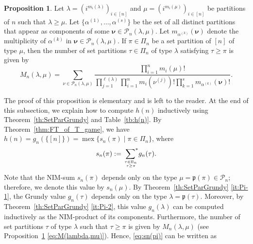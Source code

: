 \documentclass[a4paper,11pt]{amsart}
\theoremstyle{definition}
\newtheorem{prop}{Proposition}[section]
\newcommand{\mex}{\operatorname{mex}}
\newcommand{\nimadd}{\overset{*}{+}}
\newcommand{\nimsum}{{\sum}^{*}}
\numberwithin{equation}{section}
\def\Par{\mathscr{P}}
\def\fnb{\mathfrak{p}}
\def\bnu{\boldsymbol{\nu}}
\begin{document}
%
\par
%
%
%
\begin{prop}\label{lem:M(lambda,mu)}
%
Let $\lambda=(i^{m_{i}(\lambda)})_{i\in[n]}$
and $\mu=(i^{m_{i}(\mu)})_{i\in[n]}$
be partitions of $n$ such that $\lambda\geq\mu$.
%
Let $\{\alpha^{(1)},\dots,\alpha^{(s)}\}$ be the set of all distinct partitions that appear as components of some $\bnu\in\Par_{n}(\lambda,\mu)$.
Let $m_{\alpha^{(k)}}(\bnu)$ denote the multiplicity of $\alpha^{(k)}$ in $\bnu\in\Par_{n}(\lambda,\mu)$.
If $\pi\in\Pi_{n}$ be a set partition of $[n]$ of type $\mu$,
%
then the number of set partitions $\tau\in\Pi_{n}$ of type $\lambda$ satisfying $\tau\geq\pi$
 is given by
%
\begin{equation}\label{eq:M(lambda,mu)}
M_{n}(\lambda,\mu)=\sum_{\nu\in\Par_{n}(\lambda,\mu)}
\frac{\prod_{i=1}^{n}m_{i}(\mu)!}
{\prod_{j=1}^{\ell(\lambda)}\prod_{i=1}^{n}m_{i}(\nu^{(j)})!\prod_{k=1}^{s}m_{\alpha^{(k)}}(\bnu)!}.
\end{equation}
%
\end{prop}
%
%
The proof of this proposition is elementary and is left to the reader.
%
At the end of this subsection, 
we explain how to compute $h(n)$ inductively using Theorem~\ref{th:SetParGrundy} and Table~\ref{tb:h(n)}.
%
By Theorem~\ref{thm:FT_of_T_game}, we have
$h(n)=g_{n}(\{[n]\})=\mex\{s_{n}(\pi)\mid\pi\in\Pi_{n}\}$,
where
\begin{equation}\label{eq:sn(pi)}
s_{n}(\pi):=\underset{{\tau\in\Pi_{n}}\atop{\tau\geq\pi}}{\,\,\nimsum}g_{n}(\tau).
\end{equation}
%
Note that the NIM-sum $s_{n}(\pi)$
depends only on the type $\mu=\fnb(\pi)\in\Par_{n}$;
therefore, we denote this value by $s_{n}(\mu)$.
%
By Theorem~\ref{th:SetParGrundy} \ref{it:Pi-1}, 
the Grundy value $g_{n}(\tau)$ depends only on the type $\lambda=\fnb(\tau)$.
Moreover, by Theorem~\ref{th:SetParGrundy} \ref{it:Pi-2}, 
this value $g_{n}(\lambda)$ can be computed inductively as the NIM-product of its components.
Furthermore, the number of set partitions $\tau$ of type $\lambda$ such that $\tau \geq \pi$ 
is given by $M_{n}(\lambda,\mu)$
(see Proposition~\ref{lem:M(lambda,mu)} \eqref{eq:M(lambda,mu)}).
%
Hence, \eqref{eq:sn(pi)} can be written as
\end{document}
